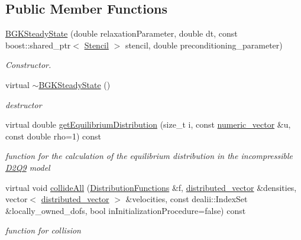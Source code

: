 \subsection*{Public Member Functions}
\begin{DoxyCompactItemize}
\item 
\hyperlink{classnatrium_1_1BGKSteadyState_a36e281915902e8ac1e347a22e382ac3f}{BGKSteadyState} (double relaxationParameter, double dt, const boost::shared\_\-ptr$<$ \hyperlink{classnatrium_1_1Stencil}{Stencil} $>$ stencil, double preconditioning\_\-parameter)
\begin{DoxyCompactList}\small\item\em Constructor. \item\end{DoxyCompactList}\item 
virtual \hyperlink{classnatrium_1_1BGKSteadyState_ab2c58f1d6b964179a2abeb5f54aa5edc}{$\sim$BGKSteadyState} ()
\begin{DoxyCompactList}\small\item\em destructor \item\end{DoxyCompactList}\item 
virtual double \hyperlink{classnatrium_1_1BGKSteadyState_ad99d9159cc14b5897bea7f145c3b39ca}{getEquilibriumDistribution} (size\_\-t i, const \hyperlink{namespacenatrium_a67c39077adc6634f8fa3762b8eef24c4}{numeric\_\-vector} \&u, const double rho=1) const 
\begin{DoxyCompactList}\small\item\em function for the calculation of the equilibrium distribution in the incompressible \hyperlink{classnatrium_1_1D2Q9}{D2Q9} model \item\end{DoxyCompactList}\item 
virtual void \hyperlink{classnatrium_1_1BGKSteadyState_a8554fb624c5a3abe01651747b3d9aeb7}{collideAll} (\hyperlink{classnatrium_1_1DistributionFunctions}{DistributionFunctions} \&f, \hyperlink{namespacenatrium_a903d2b92917f582f2ff05f52160ab811}{distributed\_\-vector} \&densities, vector$<$ \hyperlink{namespacenatrium_a903d2b92917f582f2ff05f52160ab811}{distributed\_\-vector} $>$ \&velocities, const dealii::IndexSet \&locally\_\-owned\_\-dofs, bool inInitializationProcedure=false) const 
\begin{DoxyCompactList}\small\item\em function for collision \item\end{DoxyCompactList}\end{DoxyCompactItemize}
